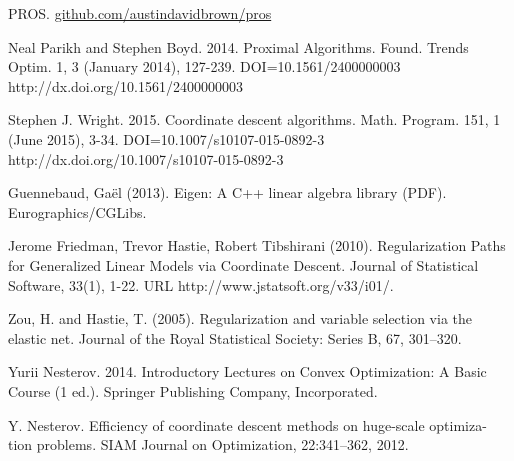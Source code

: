 \documentclass[12pt, a4paper, reqno]{article}
\numberwithin{equation}{section}
\begin{document}
%
%
\begin{thebibliography}{1}

PROS. \href{https://github.com/austindavidbrown/pros}{github.com/austindavidbrown/pros}

Neal Parikh and Stephen Boyd. 2014. Proximal Algorithms. Found. Trends Optim. 1, 3 (January 2014), 127-239. DOI=10.1561/2400000003 http://dx.doi.org/10.1561/2400000003

Stephen J. Wright. 2015. Coordinate descent algorithms. Math. Program. 151, 1 (June 2015), 3-34. DOI=10.1007/s10107-015-0892-3 http://dx.doi.org/10.1007/s10107-015-0892-3

Guennebaud, Gaël (2013). Eigen: A C++ linear algebra library (PDF). Eurographics/CGLibs.

Jerome Friedman, Trevor Hastie, Robert Tibshirani (2010). Regularization Paths for Generalized Linear Models via Coordinate Descent. Journal of Statistical Software, 33(1), 1-22. URL http://www.jstatsoft.org/v33/i01/.

Zou, H. and Hastie, T. (2005). Regularization and variable selection via the elastic net. Journal of the Royal Statistical Society: Series B, 67, 301–320.

Yurii Nesterov. 2014. Introductory Lectures on Convex Optimization: A Basic Course (1 ed.). Springer Publishing Company, Incorporated.

Y. Nesterov. Efficiency of coordinate descent methods on huge-scale optimiza- tion problems. SIAM Journal on Optimization, 22:341–362, 2012.

\end{thebibliography}
\end{document}

